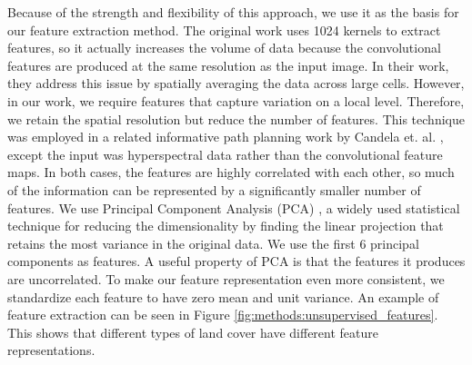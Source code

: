 Because of the strength and flexibility of this approach, we use it as the basis for our feature extraction method. The original work uses 1024 kernels to extract features, so it actually increases the volume of data because the convolutional features are produced at the same resolution as the input image. In their work, they address this issue by spatially averaging the data across large cells. However, in our work, we require features that capture variation on a local level. Therefore, we retain the spatial resolution but reduce the number of features. This technique was employed in a related informative path planning work by Candela et. al. \cite{Candela2020PlanetaryMapping}, except the input was hyperspectral data rather than the convolutional feature maps. In both cases, the features are highly correlated with each other, so much of the information can be represented by a significantly smaller number of features. We use Principal Component Analysis (PCA) \cite{Jollife2016PrincipalDevelopments}, a widely used statistical technique for reducing the dimensionality by finding the linear projection that retains the most variance in the original data. We use the first 6 principal components as features. A useful property of PCA is that the features it produces are uncorrelated. To make our feature representation even more consistent, we standardize each feature to have zero mean and unit variance. An example of feature extraction can be seen in Figure \ref{fig:methods:unsupervised_features}. This shows that different types of land cover have different feature representations.


